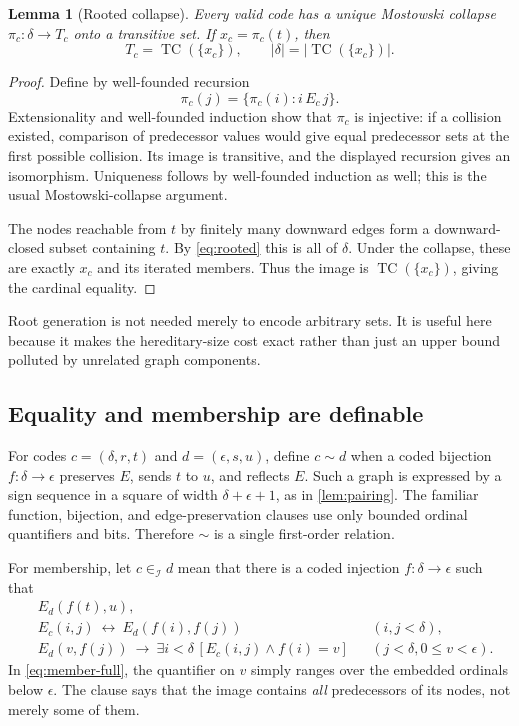 \documentclass[11pt,letterpaper]{article}
\newtheorem{lemma}[theorem]{Lemma}
\theoremstyle{definition}
\theoremstyle{remark}
\newcommand{\TC}{\operatorname{TC}}
\newcommand{\I}{\mathcal I}
\newcommand{\card}[1]{\lvert#1\rvert}
\begin{document}
\begin{lemma}[Rooted collapse]
\label{lem:collapse}
Every valid code has a unique Mostowski collapse
$\pi_c:\delta\longrightarrow T_c$ onto a transitive set. If
$x_c=\pi_c(t)$, then
\[
 T_c=\TC(\{x_c\}),\qquad
 \card\delta=\card{\TC(\{x_c\})}.
\]
\end{lemma}
\begin{proof}
Define by well-founded recursion
\[
 \pi_c(j)=\{\pi_c(i):i\,E_c\,j\}.
\]
Extensionality and well-founded induction show that $\pi_c$ is injective:
if a collision existed, comparison of predecessor values would give equal
predecessor sets at the first possible collision. Its image is transitive,
and the displayed recursion gives an isomorphism. Uniqueness follows by
well-founded induction as well; this is the usual Mostowski-collapse
argument.

The nodes reachable from $t$ by finitely many downward edges form a
downward-closed subset containing $t$. By \eqref{eq:rooted} this is all of
$\delta$. Under the collapse, these are exactly $x_c$ and its iterated
members. Thus the image is $\TC(\{x_c\})$, giving the cardinal equality.
\end{proof}

Root generation is not needed merely to encode arbitrary sets. It is useful
here because it makes the hereditary-size cost exact rather than just an
upper bound polluted by unrelated graph components.

\subsection{Equality and membership are definable}

For codes $c=(\delta,r,t)$ and $d=(\epsilon,s,u)$, define $c\sim d$ when a
coded bijection $f:\delta\to\epsilon$ preserves $E$, sends $t$ to $u$, and
reflects $E$. Such a graph is expressed by a sign sequence in a square of
width $\delta+\epsilon+1$, as in \cref{lem:pairing}. The familiar function,
bijection, and edge-preservation clauses use only bounded ordinal
quantifiers and bits. Therefore $\sim$ is a single first-order relation.

For membership, let $c\in_\I d$ mean that there is a coded injection
$f:\delta\to\epsilon$ such that
\begin{align}
 &E_d(f(t),u),\label{eq:member-root}\\
 &E_c(i,j)\ \longleftrightarrow\ E_d(f(i),f(j))
       &&(i,j<\delta),\label{eq:member-edge}\\
 &E_d(v,f(j))\ \longrightarrow\
       \exists i<\delta\,[E_c(i,j)\land f(i)=v]
       &&(j<\delta,0\le v<\epsilon).\label{eq:member-full}
\end{align}
In \eqref{eq:member-full}, the quantifier on $v$ simply ranges over the
embedded ordinals below $\epsilon$. The clause says that the image contains
\emph{all} predecessors of its nodes, not merely some of them.
\end{document}
